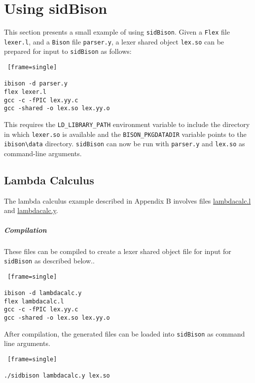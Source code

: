 \chapter{Using sidBison}

This section presents a small example of using \verb|sidBison|. Given a \verb|Flex| file \verb|lexer.l|, and a \verb|Bison| file \verb|parser.y|, a lexer shared object  \verb|lex.so| can be prepared for input to \verb|sidBison| as follows:

\begin{Verbatim} [frame=single]

ibison -d parser.y
flex lexer.l   
gcc -c -fPIC lex.yy.c
gcc -shared -o lex.so lex.yy.o

\end{Verbatim}

This requires the \verb|LD_LIBRARY_PATH| environment variable to include the directory in which \verb|lexer.so| is available and the \verb|BISON_PKGDATADIR| variable points to the \verb|ibison\data| directory. \verb|sidBison| can now be run with \verb|parser.y| and \verb|lex.so| as command-line arguments.

\section{Lambda Calculus}

The lambda calculus example described in Appendix B involves files \href{https://github.com/sidprasad/sidbison/blob/master/lambdacalcexample/lambdacalc.l}{lambdacalc.l} and \href{https://github.com/sidprasad/sidbison/blob/master/lambdacalcexample/lambdacalc.y}{lambdacalc.y}.

\paragraph{Compilation} These files can be compiled to create a lexer shared object file for input for \verb|sidBison| as described below..

\begin{Verbatim} [frame=single]

ibison -d lambdacalc.y
flex lambdacalc.l   
gcc -c -fPIC lex.yy.c
gcc -shared -o lex.so lex.yy.o

\end{Verbatim}

After compilation, the generated files can be loaded into \verb|sidBison| as command line arguments.

\begin{Verbatim} [frame=single]

./sidbison lambdacalc.y lex.so

\end{Verbatim}

